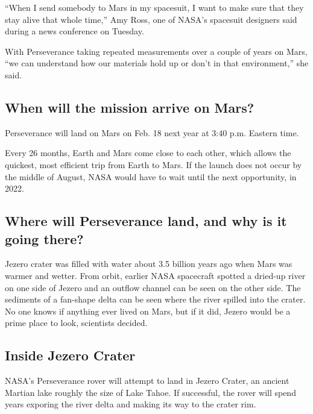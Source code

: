 ``When I send somebody to Mars in my spacesuit, I want to make sure that
they stay alive that whole time,'' Amy Ross, one of NASA's spacesuit
designers said during a news conference on Tuesday.

With Perseverance taking repeated measurements over a couple of years on
Mars, ``we can understand how our materials hold up or don't in that
environment,'' she said.

\hypertarget{when-will-the-mission-arrive-on-mars}{%
\subsection{When will the mission arrive on
Mars?}\label{when-will-the-mission-arrive-on-mars}}

Perseverance will land on Mars on Feb. 18 next year at 3:40 p.m. Eastern
time.

Every 26 months, Earth and Mars come close to each other, which allows
the quickest, most efficient trip from Earth to Mars. If the launch does
not occur by the middle of August, NASA would have to wait until the
next opportunity, in 2022.

\hypertarget{where-will-perseverance-land-and-why-is-it-going-there}{%
\subsection{Where will Perseverance land, and why is it going
there?}\label{where-will-perseverance-land-and-why-is-it-going-there}}

Jezero crater was filled with water about 3.5 billion years ago when
Mars was warmer and wetter. From orbit, earlier NASA spacecraft spotted
a dried-up river on one side of Jezero and an outflow channel can be
seen on the other side. The sediments of a fan-shape delta can be seen
where the river spilled into the crater. No one knows if anything ever
lived on Mars, but if it did, Jezero would be a prime place to look,
scientists decided.

\hypertarget{inside-jezero-crater}{%
\subsection{Inside Jezero Crater}\label{inside-jezero-crater}}

NASA's Perseverance rover will attempt to land in Jezero Crater, an
ancient Martian lake roughly the size of Lake Tahoe. If successful, the
rover will spend years exporing the river delta and making its way to
the crater rim.


